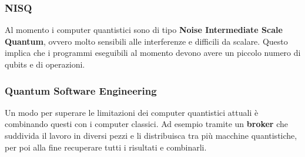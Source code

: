 \subsubsection{NISQ}
Al momento i computer quantistici sono di tipo \textbf{Noise Intermediate Scale Quantum}, ovvero molto sensibili alle interferenze e difficili da scalare. Questo implica che i programmi eseguibili al momento devono avere un piccolo numero di qubits e di operazioni.
\subsubsection{Quantum Software Engineering}
Un modo per superare le limitazioni dei computer quantistici attuali è combinando questi con i computer classici. Ad esempio tramite un \textbf{broker} che suddivida il lavoro in diversi pezzi e li distribuisca tra più macchine quantistiche, per poi alla fine recuperare tutti i risultati e combinarli.